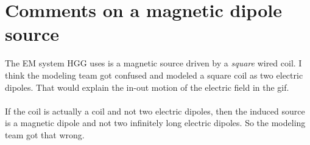 \documentclass[a4paper,12pt]{article}
\begin{document}
	\section*{Comments on a magnetic dipole source}
	The EM system HGG uses is a magnetic source driven by a {\it square} wired coil. I think the modeling team got confused and modeled a square coil as two electric dipoles. That would explain the in-out motion of the electric field in the gif.
	\\\\
	If the coil is actually a coil and not two electric dipoles, then the induced source is a magnetic dipole and not two infinitely long electric dipoles. So the modeling team got that wrong.
	
	
\end{document}
